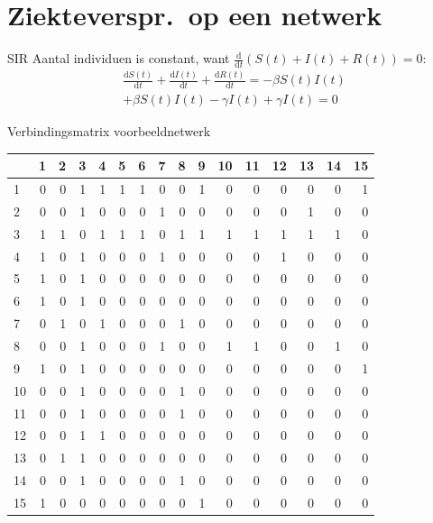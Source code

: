 \documentclass[handout]{beamer}
\begin{document}
\section{Ziekteverspr.\ op een netwerk}
\begin{frame}{SIR}
Aantal individuen is constant, want $\frac{\text{d}}{\text{d}t}(S(t) + I(t) +R(t))= 0$:
\begin{multline*}
\frac{\text{d}S(t)}{\text{d}t} + \frac{\text{d}I(t)}{\text{d}t}+ \frac{\text{d}R(t)}{\text{d}t}= -\beta  S(t)  I(t) \\+\beta  S(t) I(t) - \gamma  I(t)+\gamma I(t)=0
\end{multline*}
\end{frame}

\begin{frame}{Verbindingsmatrix voorbeeldnetwerk}
\small
\begin{tabular}{l|rrrrrrrrrrrrrrr}

{} &  1  &  2  &  3  &  4  &  5  &  6  &  7  &  8  &  9  &  10 &  11 &  12 &  13 &  14 &  15 \\
\hline
1  &   0 &   0 &   1 &   1 &   1 &   1 &   0 &   0 &   1 &   0 &   0 &   0 &   0 &   0 &   1 \\
2  &   0 &   0 &   1 &   0 &   0 &   0 &   1 &   0 &   0 &   0 &   0 &   0 &   1 &   0 &   0 \\
3  &   1 &   1 &   0 &   1 &   1 &   1 &   0 &   1 &   1 &   1 &   1 &   1 &   1 &   1 &   0 \\
4  &   1 &   0 &   1 &   0 &   0 &   0 &   1 &   0 &   0 &   0 &   0 &   1 &   0 &   0 &   0 \\
5  &   1 &   0 &   1 &   0 &   0 &   0 &   0 &   0 &   0 &   0 &   0 &   0 &   0 &   0 &   0 \\
6  &   1 &   0 &   1 &   0 &   0 &   0 &   0 &   0 &   0 &   0 &   0 &   0 &   0 &   0 &   0 \\
7  &   0 &   1 &   0 &   1 &   0 &   0 &   0 &   1 &   0 &   0 &   0 &   0 &   0 &   0 &   0 \\
8  &   0 &   0 &   1 &   0 &   0 &   0 &   1 &   0 &   0 &   1 &   1 &   0 &   0 &   1 &   0 \\
9  &   1 &   0 &   1 &   0 &   0 &   0 &   0 &   0 &   0 &   0 &   0 &   0 &   0 &   0 &   1 \\
10 &   0 &   0 &   1 &   0 &   0 &   0 &   0 &   1 &   0 &   0 &   0 &   0 &   0 &   0 &   0 \\
11 &   0 &   0 &   1 &   0 &   0 &   0 &   0 &   1 &   0 &   0 &   0 &   0 &   0 &   0 &   0 \\
12 &   0 &   0 &   1 &   1 &   0 &   0 &   0 &   0 &   0 &   0 &   0 &   0 &   0 &   0 &   0 \\
13 &   0 &   1 &   1 &   0 &   0 &   0 &   0 &   0 &   0 &   0 &   0 &   0 &   0 &   0 &   0 \\
14 &   0 &   0 &   1 &   0 &   0 &   0 &   0 &   1 &   0 &   0 &   0 &   0 &   0 &   0 &   0 \\
15 &   1 &   0 &   0 &   0 &   0 &   0 &   0 &   0 &   1 &   0 &   0 &   0 &   0 &   0 &   0 \\

\end{tabular}
\end{frame}
\end{document}
